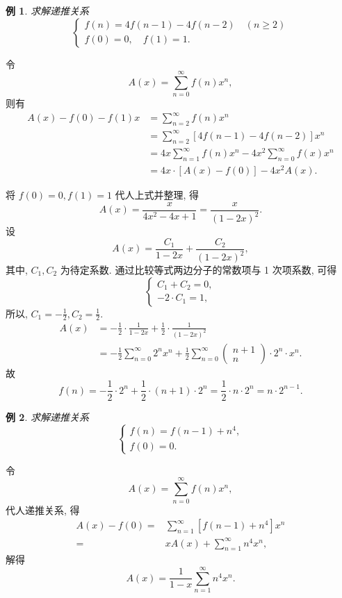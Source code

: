 \documentclass[punct]{ctexbeamer}
\newtheorem{ex}{例}[section]
\def\sol{\noindent {\bf 解\ }}
\begin{document}
\begin{frame}
	\begin{ex}
		求解递推关系$$
		\left\{\begin{array}{l}
			f(n)=4 f(n-1)-4 f(n-2) \quad(n \geqslant 2) \\
			f(0)=0, \quad f(1)=1 .
		\end{array}\right.
		$$
	\end{ex}
\pause\sol
令
$$
A(x)=\sum_{n=0}^{\infty} f(n) x^n,
$$
则有
$$
\begin{aligned}
	A(x)-f(0)-f(1) x &=\sum_{n=2}^{\infty} f(n) x^n \\
	&=\sum_{n=2}^{\infty}[4 f(n-1)-4 f(n-2)] x^n \\
	&=4 x \sum_{n=1}^{\infty} f(n) x^n-4 x^2 \sum_{n=0}^{\infty} f(x) x^n \\
	&=4 x \cdot[A(x)-f(0)]-4 x^2 A(x) .
\end{aligned}
$$
\end{frame}

\begin{frame}
	将 $f(0)=0, f(1)=1$ 代人上式并整理, 得
	$$
	A(x)=\frac{x}{4 x^2-4 x+1}=\frac{x}{(1-2 x)^2} .
	$$
	设
	$$
	A(x)=\frac{C_1}{1-2 x}+\frac{C_2}{(1-2 x)^2},
	$$
	其中, $C_1, C_2$ 为待定系数. 通过比较等式两边分子的常数项与 1 次项系数, 可得
	$$
	\left\{\begin{array}{l}
		C_1+C_2=0, \\
		-2 \cdot C_1=1,
	\end{array}\right.
	$$
	所以, $C_1=-\frac{1}{2}, C_2=\frac{1}{2}$.
	$$
	\begin{aligned}
		A(x) &=-\frac{1}{2} \cdot \frac{1}{1-2 x}+\frac{1}{2} \cdot \frac{1}{(1-2 x)^2} \\
		&=-\frac{1}{2} \sum_{n=0}^{\infty} 2^n x^n+\frac{1}{2} \sum_{n=0}^{\infty}\left(\begin{array}{c}
			n+1 \\
			n
		\end{array}\right) \cdot 2^n \cdot x^n .
	\end{aligned}
	$$
	故
	$$
	f(n)=-\frac{1}{2} \cdot 2^n+\frac{1}{2} \cdot(n+1) \cdot 2^n=\frac{1}{2} \cdot n \cdot 2^n=n\cdot 2^{n-1} .
	$$

\end{frame}

\begin{frame}
	\begin{ex}
		求解递推关系
		$$
		\left\{\begin{array}{l}
			f(n)=f(n-1)+n^4, \\
			f(0)=0 .
		\end{array}\right.
		$$
	\end{ex}
\pause\sol
令
$$
A(x)=\sum_{n=0}^{\infty} f(n) x^n,
$$
代人递推关系, 得
\[\begin{aligned}
	A(x)-f(0)=&\sum_{n=1}^{\infty}[f(n-1)+n^{4}]x^{n}\\
	=&x A(x)+\sum_{n=1}^{\infty} n^4 x^n,
\end{aligned}
\]
解得
$$
A(x)=\frac{1}{1-x} \sum_{n=1}^{\infty} n^4 x^n .
$$

\end{frame}
\end{document}
